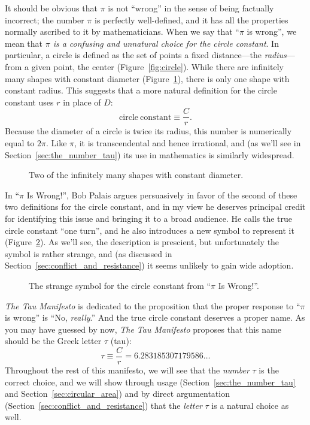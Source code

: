 It should be obvious that $\pi$ is not ``wrong'' in the sense of being factually incorrect; the number $\pi$ is perfectly well-defined, and it has all the properties normally ascribed to it by mathematicians. When we say that ``$\pi$ is wrong'', we mean that \emph{$\pi$ is a confusing and unnatural choice for the circle constant}. In particular, a circle is defined as the set of points a fixed distance---the \emph{radius}---from a given point, the center (Figure~\ref{fig:circle}). While there are infinitely many shapes with constant diameter (Figure~\ref{fig:bicycle_constant_diameters}), there is only one shape with constant radius. This suggests that a more natural definition for the circle constant uses $r$ in place of $D$:
\[
  \mathrm{circle\ constant} \equiv \frac{C}{r}.
\]
Because the diameter of a circle is twice its radius, this number is numerically equal to $2\pi$. Like $\pi$, it is transcendental and hence irrational, and (as we'll see in Section~\ref{sec:the_number_tau}) its use in mathematics is similarly widespread.

\begin{figure}
\caption{Two of the infinitely many shapes with constant diameter.\label{fig:bicycle_constant_diameters}}
\end{figure}

In ``$\pi$ Is Wrong!'', Bob Palais argues persuasively in favor of the second of these two definitions for the circle constant, and in my view he deserves principal credit for identifying this issue and bringing it to a broad audience. He calls the true circle constant ``one turn'', and he also introduces a new symbol to represent it (Figure~\ref{fig:palais_tau}). As we'll see, the description is prescient, but unfortunately the symbol is rather strange, and (as discussed in Section~\ref{sec:conflict_and_resistance}) it seems unlikely to gain wide adoption.

\begin{figure}
\caption{The strange symbol for the circle constant from ``$\pi$ Is Wrong!''.\label{fig:palais_tau}}
\end{figure}

\emph{The Tau Manifesto} is dedicated to the proposition that the proper response to ``$\pi$ is wrong'' is ``No, \emph{really}.'' And the true circle constant deserves a proper name. As you may have guessed by now, \emph{The Tau Manifesto} proposes that this name should be the Greek letter $\tau$ (tau):
\[
  \tau \equiv \frac{C}{r} = 6.283185307179586\ldots
\]
Throughout the rest of this manifesto, we will see that the \emph{number} $\tau$ is the correct choice, and we will show through usage (Section~\ref{sec:the_number_tau} and Section~\ref{sec:circular_area}) and by direct argumentation (Section~\ref{sec:conflict_and_resistance}) that the \emph{letter} $\tau$ is a natural choice as well.

